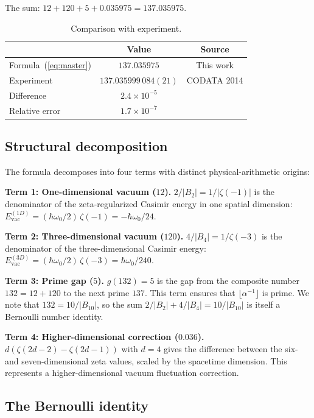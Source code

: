 \documentclass[11pt,a4paper]{article}
\begin{document}
The sum: $12 + 120 + 5 + 0.035975 = 137.035975$.

\begin{table}[h]
\centering
\caption{Comparison with experiment.}
\label{tab:comparison}
\begin{tabular}{@{}lcc@{}}
\toprule
& Value & Source \\
\midrule
Formula~(\ref{eq:master}) & $137.035975$ & This work \\
Experiment~\cite{Mohr2016} & $137.035999\,084(21)$ & CODATA 2014 \\
\midrule
Difference & $2.4 \times 10^{-5}$ & \\
Relative error & $1.7 \times 10^{-7}$ & \\
\bottomrule
\end{tabular}
\end{table}

\subsection{Structural decomposition}

The formula decomposes into four terms with distinct
physical-arithmetic origins:

\textbf{Term 1: One-dimensional vacuum ($12$).}
$2/|B_2| = 1/|\zeta(-1)|$ is the denominator of the
zeta-regularized Casimir energy in one spatial dimension:
$E_{\mathrm{vac}}^{(1D)} = (\hbar\omega_0/2)\,\zeta(-1)
= -\hbar\omega_0/24$.

\textbf{Term 2: Three-dimensional vacuum ($120$).}
$4/|B_4| = 1/\zeta(-3)$ is the denominator of the
three-dimensional Casimir energy:
$E_{\mathrm{vac}}^{(3D)} = (\hbar\omega_0/2)\,\zeta(-3)
= \hbar\omega_0/240$.

\textbf{Term 3: Prime gap ($5$).}
$g(132) = 5$ is the gap from the composite number
$132 = 12 + 120$ to the next prime $137$.
This term ensures that $\lfloor\alpha^{-1}\rfloor$ is prime.
We note that $132 = 10/|B_{10}|$, so the sum
$2/|B_2| + 4/|B_4| = 10/|B_{10}|$ is itself a Bernoulli
number identity.

\textbf{Term 4: Higher-dimensional correction ($0.036$).}
$d(\zeta(2d{-}2) - \zeta(2d{-}1))$ with $d = 4$ gives the
difference between the six- and seven-dimensional zeta values,
scaled by the spacetime dimension. This represents a
higher-dimensional vacuum fluctuation correction.

\subsection{The Bernoulli identity}
\end{document}
